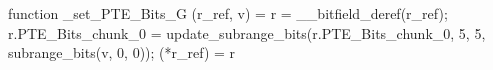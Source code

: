 function _set_PTE_Bits_G (r_ref, v) = {
    r = __bitfield_deref(r_ref);
    r.PTE_Bits_chunk_0 = update_subrange_bits(r.PTE_Bits_chunk_0, 5, 5, subrange_bits(v, 0, 0));
    (*r_ref) = r
}
